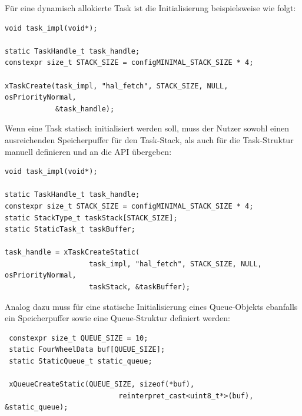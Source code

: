 
Für eine dynamisch allokierte Task ist die Initialisierung beispielsweise wie
folgt:

\begin{code}
\begin{verbatim}
void task_impl(void*);

static TaskHandle_t task_handle;
constexpr size_t STACK_SIZE = configMINIMAL_STACK_SIZE * 4;

xTaskCreate(task_impl, "hal_fetch", STACK_SIZE, NULL, osPriorityNormal,
            &task_handle);
\end{verbatim}
\end{code}

Wenn eine Task statisch initialisiert werden soll, muss der Nutzer sowohl einen
ausreichenden Speicherpuffer für den Task-Stack, als auch für die Task-Struktur
manuell definieren und an die API übergeben:

\begin{code}
\begin{verbatim}
void task_impl(void*);

static TaskHandle_t task_handle;
constexpr size_t STACK_SIZE = configMINIMAL_STACK_SIZE * 4;
static StackType_t taskStack[STACK_SIZE];
static StaticTask_t taskBuffer;

task_handle = xTaskCreateStatic(
                    task_impl, "hal_fetch", STACK_SIZE, NULL, osPriorityNormal,
                    taskStack, &taskBuffer);
\end{verbatim}
\end{code}

Analog dazu muss für eine statische Initialisierung eines Queue-Objekts
ebanfalls ein Speicherpuffer sowie eine Queue-Struktur definiert werden:

\begin{code}
\begin{verbatim}
 constexpr size_t QUEUE_SIZE = 10;
 static FourWheelData buf[QUEUE_SIZE];
 static StaticQueue_t static_queue;

 xQueueCreateStatic(QUEUE_SIZE, sizeof(*buf),
                           reinterpret_cast<uint8_t*>(buf), &static_queue);
\end{verbatim}
\end{code}

